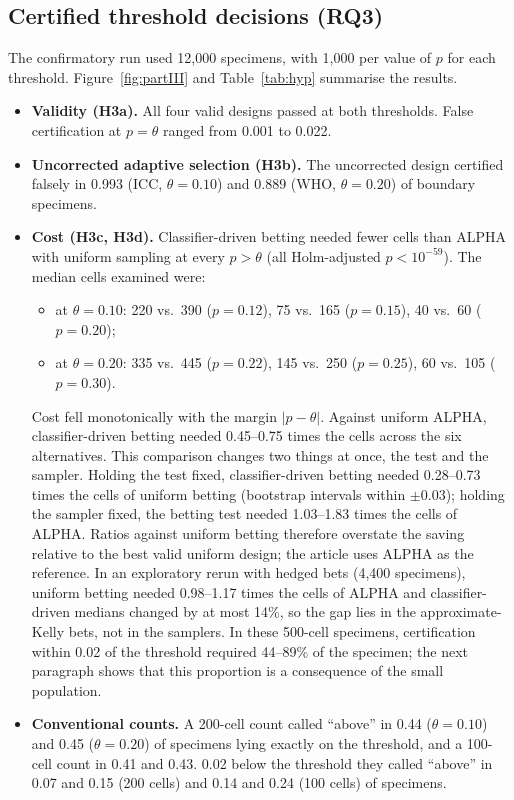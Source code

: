\documentclass[11pt]{article}
\theoremstyle{remark}
\theoremstyle{definition}
\begin{document}
\subsection{Certified threshold decisions (RQ3)}\label{sec:rq3res}
The confirmatory run used 12,000 specimens, with 1,000 per value of $p$ for each threshold. Figure~\ref{fig:partIII} and Table~\ref{tab:hyp} summarise the results.
\begin{itemize}
\item \textbf{Validity (H3a).} All four valid designs passed at both thresholds. False certification at $p=\theta$ ranged from 0.001 to 0.022.
\item \textbf{Uncorrected adaptive selection (H3b).} The uncorrected design certified falsely in 0.993 (ICC, $\theta=0.10$) and 0.889 (WHO, $\theta=0.20$) of boundary specimens.
\item \textbf{Cost (H3c, H3d).} Classifier-driven betting needed fewer cells than ALPHA with uniform sampling at every $p>\theta$ (all Holm-adjusted $p<10^{-59}$). The median cells examined were:
  \begin{itemize}
  \item at $\theta=0.10$: 220 vs.\ 390 ($p=0.12$), 75 vs.\ 165 ($p=0.15$), 40 vs.\ 60 ($p=0.20$);
  \item at $\theta=0.20$: 335 vs.\ 445 ($p=0.22$), 145 vs.\ 250 ($p=0.25$), 60 vs.\ 105 ($p=0.30$).
  \end{itemize}
  Cost fell monotonically with the margin $|p-\theta|$. Against uniform ALPHA, classifier-driven betting needed 0.45--0.75 times the cells across the six alternatives. This comparison changes two things at once, the test and the sampler. Holding the test fixed, classifier-driven betting needed 0.28--0.73 times the cells of uniform betting (bootstrap intervals within $\pm0.03$); holding the sampler fixed, the betting test needed 1.03--1.83 times the cells of ALPHA. Ratios against uniform betting therefore overstate the saving relative to the best valid uniform design; the article uses ALPHA as the reference. In an exploratory rerun with hedged bets (4,400 specimens), uniform betting needed 0.98--1.17 times the cells of ALPHA and classifier-driven medians changed by at most 14\%, so the gap lies in the approximate-Kelly bets, not in the samplers. In these 500-cell specimens, certification within 0.02 of the threshold required 44--89\% of the specimen; the next paragraph shows that this proportion is a consequence of the small population.
\item \textbf{Conventional counts.} A 200-cell count called ``above'' in 0.44 ($\theta=0.10$) and 0.45 ($\theta=0.20$) of specimens lying exactly on the threshold, and a 100-cell count in 0.41 and 0.43. 0.02 below the threshold they called ``above'' in 0.07 and 0.15 (200 cells) and 0.14 and 0.24 (100 cells) of specimens.
\end{itemize}
\end{document}
